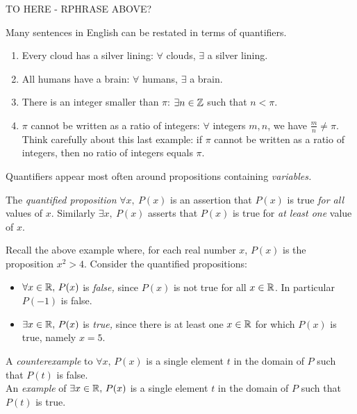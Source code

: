 TO HERE - RPHRASE ABOVE?

 Many sentences in English can be restated in terms of quantifiers.

\begin{examples}{}{}
\begin{enumerate}
\item Every cloud has a silver lining: $\forall$ clouds, $\exists$ a silver lining.
\item All humans have a brain: $\forall$ humans, $\exists$ a brain.
\item There is an integer smaller than $\pi$: $\exists n\in\mathbb{Z}$ such that $n<\pi$.
\item $\pi$ cannot be written as a ratio of integers: $\forall$ integers $m,n$, we have $\frac{m}{n}\neq\pi$.\\
Think carefully about this last example: if $\pi$ cannot be written as a ratio of integers, then no ratio of integers equals $\pi$.
\end{enumerate}
\end{examples}


Quantifiers appear most often around propositions containing \emph{variables.}



\begin{defn}{}{}
The \emph{quantified proposition} $\forall x,\ P(x)$ is an assertion that $P(x)$ is true \emph{for all} values of $x$. Similarly $\exists x,\ P(x)$ asserts that $P(x)$ is true for \emph{at least one} value of $x$.
\end{defn}

\begin{example}{}{}
Recall the above example where, for each real number $x$, $P(x)$ is the proposition $x^2>4$. Consider the quantified propositions:
\begin{itemize}
  \item $\forall x\in\mathbb{R},\, P(x)$ is \emph{false,} since $P(x)$ is not true for all $x\in\mathbb{R}$. In particular $P(-1)$ is false.
  \item $\exists x\in\mathbb{R},\, P(x)$ is \emph{true,} since there is at least one $x\in\mathbb{R}$ for which $P(x)$ is true, namely $x=5$.
\end{itemize}
\end{example}

\begin{defn}{}{}
A \emph{counterexample} to $\forall x,\, P(x)$ is a single element $t$ in the domain of $P$ such that $P(t)$ is false.\\
An \emph{example} of $\exists x\in\mathbb{R},\, P(x)$ is a single element $t$ in the domain of $P$ such that $P(t)$ is true.
\end{defn}

